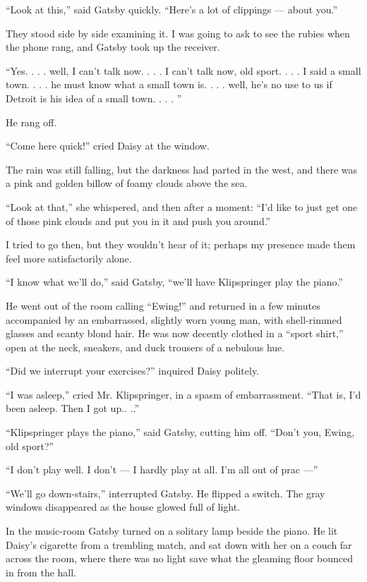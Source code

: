 \documentclass{znotebook}
\begin{document}
``Look at this,'' said Gatsby quickly. ``Here's a lot of clippings ---{} about you.''

They stood side by side examining it. I was going to ask to see the rubies when the phone rang, and Gatsby took up the receiver.

``Yes. . . . well, I can't talk now. . . . I can't talk now, old sport. . . . I said a small town. . . . he must know what a small town is. . . . well, he's no use to us if Detroit is his idea of a small town. . . . ''

He rang off.

``Come here quick!'' cried Daisy at the window.

The rain was still falling, but the darkness had parted in the west, and there was a pink and golden billow of foamy clouds above the sea.

``Look at that,'' she whispered, and then after a moment: ``I'd like to just get one of those pink clouds and put you in it and push you around.''

I tried to go then, but they wouldn't hear of it; perhaps my presence made them feel more satisfactorily alone.

``I know what we'll do,'' said Gatsby, ``we'll have Klipspringer play the piano.''

He went out of the room calling ``Ewing!'' and returned in a few minutes accompanied by an embarrassed, slightly worn young man, with shell-rimmed glasses and scanty blond hair. He was now decently clothed in a ``sport shirt,'' open at the neck, sneakers, and duck trousers of a nebulous hue.

``Did we interrupt your exercises?'' inquired Daisy politely.

``I was asleep,'' cried Mr. Klipspringer, in a spasm of embarrassment. ``That is, I'd been asleep. Then I got up.. ..''

``Klipspringer plays the piano,'' said Gatsby, cutting him off. ``Don't you, Ewing, old sport?''

``I don't play well. I don't ---{} I hardly play at all. I'm all out of prac ---''

``We'll go down-stairs,'' interrupted Gatsby. He flipped a switch. The gray windows disappeared as the house glowed full of light.

In the music-room Gatsby turned on a solitary lamp beside the piano. He lit Daisy's cigarette from a trembling match, and sat down with her on a couch far across the room, where there was no light save what the gleaming floor bounced in from the hall.
\end{document}
